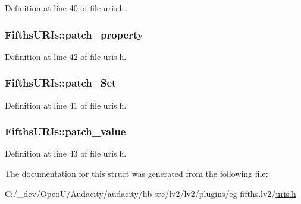 Definition at line 40 of file uris.\+h.

\subsubsection[{\texorpdfstring{patch\+\_\+property}{patch_property}}]{ Fifths\+U\+R\+Is\+::patch\+\_\+property}\hypertarget{struct_fifths_u_r_is_a06c1b1534d80599d5d7ad1a5ff6cc888}{}\label{struct_fifths_u_r_is_a06c1b1534d80599d5d7ad1a5ff6cc888}


Definition at line 42 of file uris.\+h.

\subsubsection[{\texorpdfstring{patch\+\_\+\+Set}{patch_Set}}]{ Fifths\+U\+R\+Is\+::patch\+\_\+\+Set}\hypertarget{struct_fifths_u_r_is_ad0ef6cabd2b1afecb4423c775e277687}{}\label{struct_fifths_u_r_is_ad0ef6cabd2b1afecb4423c775e277687}


Definition at line 41 of file uris.\+h.

\subsubsection[{\texorpdfstring{patch\+\_\+value}{patch_value}}]{ Fifths\+U\+R\+Is\+::patch\+\_\+value}\hypertarget{struct_fifths_u_r_is_ad499f8d012612a45ed252bbc6d4b1798}{}\label{struct_fifths_u_r_is_ad499f8d012612a45ed252bbc6d4b1798}


Definition at line 43 of file uris.\+h.



The documentation for this struct was generated from the following file\+:\begin{DoxyCompactItemize}
\item 
C\+:/\+\_\+dev/\+Open\+U/\+Audacity/audacity/lib-\/src/lv2/lv2/plugins/eg-\/fifths.\+lv2/\hyperlink{eg-fifths_8lv2_2uris_8h}{uris.\+h}\end{DoxyCompactItemize}
